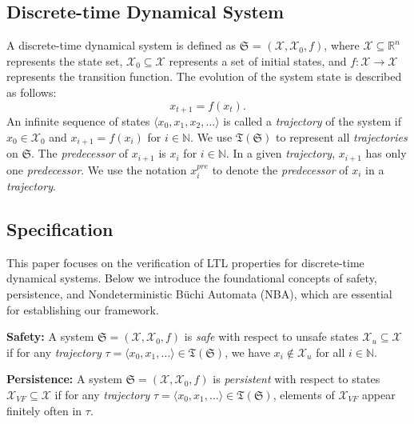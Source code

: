 \subsection{Discrete-time Dynamical System}
\label{dtds}
A discrete-time dynamical system is defined as $\mathfrak{S}$ = $(\mathcal{X}, \mathcal{X}_0, f)$, where $\mathcal{X} \subseteq \mathbb{R}^n$ represents the state set, $\mathcal{X}_{0} \subseteq \mathcal{X}$ represents a set of initial states, and $f: \mathcal{X} \rightarrow \mathcal{X}$ represents the transition function. The evolution of the system state is described as follows:
\[
  x_{t+1} = f(x_t).
\]
An infinite sequence of states $\langle x_0, x_1, x_2, \dots \rangle$ is called a \emph{trajectory} of the system if $x_0 \in \mathcal{X}_0$ and $x_{i+1} = f(x_{i})$ for $i \in \mathbb{N}$. We use $\mathfrak{T}(\mathfrak{S})$ to represent all \emph{trajectories} on $\mathfrak{S}$. The \emph{predecessor} of \(x_{i+1}\) is \(x_i\) for \(i \in \mathbb{N}\). In a given \emph{trajectory}, \(x_{i+1}\) has only one \emph{predecessor}. We use the notation \(x_{i}^{pre}\) to denote the \emph{predecessor} of \(x_{i}\) in a \emph{trajectory}.
\subsection{Specification}
\label{specification123}
This paper focuses on the verification of LTL properties for discrete-time dynamical systems. Below we introduce the foundational concepts of safety, persistence, and Nondeterministic Büchi Automata (NBA), which are essential for establishing our framework.

\textbf{Safety:} A system $\mathfrak{S}=(\mathcal{X}, \mathcal{X}_0, f)$ is \emph{safe} with respect to unsafe states $\mathcal{X}_u \subseteq \mathcal{X}$ if for any \emph{trajectory} $\tau = \langle x_0, x_1, \dots \rangle \in \mathfrak{T}(\mathfrak{S})$, we have $x_i \not\in \mathcal{X}_u$ for all $i \in \mathbb{N}$.

\textbf{Persistence:} A system $\mathfrak{S}=(\mathcal{X}, \mathcal{X}_0, f)$ is \emph{persistent} with respect to states $\mathcal{X}_{VF} \subseteq \mathcal{X}$ if for any \emph{trajectory} $\tau = \langle x_0, x_1, \dots \rangle \in \mathfrak{T}(\mathfrak{S})$, elements of $\mathcal{X}_{VF}$ appear finitely often in $\tau$.


